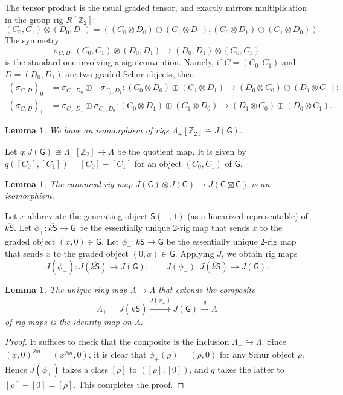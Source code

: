 \documentclass[12pt,reqno]{amsart}
\theoremstyle{plain}
\newtheorem{lem}[thm]{Lemma}
\theoremstyle{definition}
\theoremstyle{remark}
\newcommand{\maps}{\colon}
\newcommand{\category}[1]{\mathsf{#1}}
\renewcommand{\S}{\category S}
\newcommand{\Z}{\mathbb Z}
\newcommand{\G}{\mathsf{G}} %
\newcommand{\ksbar}{\overline{k\S}}
\numberwithin{thm}{section}
\begin{document}
The tensor product is the usual graded tensor, and exactly mirrors multiplication in the group rig $R[\Z_2]$: 
\[
    (C_0, C_1) \otimes (D_0, D_1) = ((C_0 \otimes D_0) \oplus (C_1 \otimes D_1), (C_0 \otimes D_1) \oplus (C_1 \otimes D_0)).
\]
The symmetry 
\[
    \sigma_{C,D} \maps (C_0, C_1) \otimes (D_0, D_1) \to (D_0, D_1) \otimes (C_0, C_1)
\]
is the standard one involving a sign convention. Namely, if $C = (C_0, C_1)$ and $D = (D_0, D_1)$ are two graded Schur objects, then 
\begin{align*}
    (\sigma_{C, D})_0 &= \sigma_{C_0, D_0} \oplus -\sigma_{C_1, D_1} \maps (C_0 \otimes D_0) \oplus (C_1 \otimes D_1) \to (D_0 \otimes C_0) \oplus (D_1 \otimes C_1); 
    \\
    (\sigma_{C, D})_1 &= \sigma_{C_0, D_1} \oplus \sigma_{C_1, D_0} \maps (C_0 \otimes D_1) \oplus (C_1 \otimes D_0) \to (D_1 \otimes C_0) \oplus (D_0 \otimes C_1).
\end{align*}

\begin{lem}
    We have an isomorphism of rigs $\Lambda_+[\Z_2] \cong J(\G)$.
\end{lem}

Let $q \maps J(\G) \cong \Lambda_+[\Z_2] \to \Lambda$ be the quotient map. It is given by $q([C_0], [C_1]) = [C_0] - [C_1]$ for an object $(C_0, C_1)$ of $\G$.

\begin{lem}
\label{prop:J-on-boxtimes-G}
    The canonical rig map $J(\G) \otimes J(\G)\to J(\G \boxtimes \G)$ is an isomorphism. 
\end{lem}

Let $x$ abbreviate the generating object $\S(-, 1)$ (as a linearized representable) of $\ksbar$. Let $\phi_+ \maps \ksbar \to \G$ be the essentially unique 2-rig map that sends $x$ to the graded object $(x, 0) \in \G$. Let $\phi_- \maps \ksbar \to \G$ be the essentially unique 2-rig map that sends $x$ to the graded object $(0, x) \in \G$. Applying $J$, we obtain rig maps 
\[
    J(\phi_+) \maps J(\ksbar) \to J(\G), \qquad J(\phi_{-}) \maps J(\ksbar) \to J(\G).
\]

\begin{lem}
\label{prop:phi-plus-gives-id}
    The unique ring map $\Lambda \to \Lambda$ that extends the composite 
    \[
    \Lambda_+ = J(\ksbar) \xrightarrow{J(\phi_+)} J(\G) \xrightarrow{q} \Lambda
    \]
    of rig maps is the identity map on $\Lambda$. 
\end{lem} 

\begin{proof}
    It suffices to check that the composite is the inclusion $\Lambda_+ \hookrightarrow \Lambda$. Since $(x, 0)^{\otimes n} = (x^{\otimes n}, 0)$, it is clear that $\phi_+(\rho) = (\rho, 0)$ for any Schur object $\rho$. Hence $J(\phi_+)$ takes a class $[\rho]$ to $([\rho],[0])$, and $q$ takes the latter to $[\rho] - [0] = [\rho]$. This completes the proof. 
\end{proof}
\end{document}
